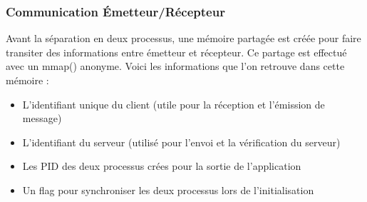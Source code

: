 \documentclass{article}
\begin{document}
	\subsubsection{Communication Émetteur/Récepteur}
	\par Avant la séparation en deux processus, une mémoire partagée est créée pour faire transiter des informations entre émetteur et récepteur. Ce partage est effectué avec un mmap() anonyme. Voici les informations que l'on retrouve dans cette mémoire :
	\begin{itemize}\renewcommand{\labelitemi}{$\bullet$} 
		\item L'identifiant unique du client (utile pour la réception et l'émission de message)
		\item L'identifiant du serveur (utilisé pour l'envoi et la vérification du serveur)
		\item Les PID des deux processus crées pour la sortie de l'application
		\item Un flag pour synchroniser les deux processus lors de l'initialisation
	\end{itemize}
\end{document}
